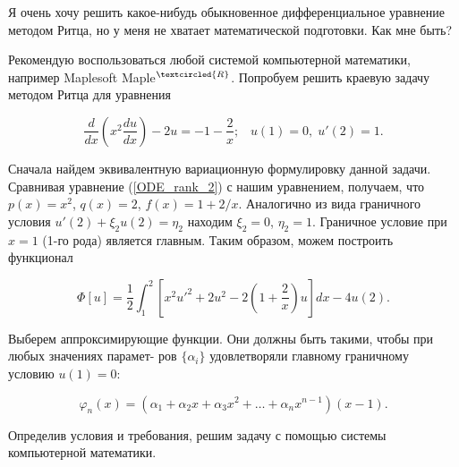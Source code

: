 \documentclass{article}
\begin{document}
\newpage
\begin{question}
	Я очень хочу решить какое-нибудь обыкновенное дифференциальное уравнение методом Ритца, но у меня не хватает математической подготовки. Как мне быть?
\end{question}

Рекомендую воспользоваться любой системой компьютерной математики, например Maplesoft Maple$^{\textcircled{ \scriptsize R \normalsize} }$. Попробуем решить краевую задачу методом Ритца для уравнения

\begin{displaymath}
	\frac{d}{dx} \left( x^{2} \frac{du}{dx} \right) - 2u = -1 - \frac{2}{x}; \; \; \; u(1) = 0, \; u'(2) = 1.
\end{displaymath}

Сначала найдем эквивалентную вариационную формулировку данной задачи. Сравнивая уравнение (\ref{ODE_rank_2}) с нашим уравнением, получаем, что $p(x) = x^{2}$, $q(x) = 2$, $f(x) = 1 + 2/x$. Аналогично из вида граничного условия $u'(2) + \xi_{2} u(2) = \eta_{2}$ находим $\xi_{2} = 0$, $\eta_{2} = 1$. Граничное условие при $x = 1$ (1-го рода) является главным. Таким образом, можем построить функционал

\begin{displaymath}
	\Phi[u] = \frac{1}{2} \int_{1}^{2} \left[ x^{2} u'^{2} + 2 u^{2} - 2 \left( 1 + \frac{2}{x} \right) u \right] dx - 4 u(2).
\end{displaymath}

Выберем аппроксимирующие функции. Они должны быть такими, чтобы при любых значениях парамет-
ров $\{\alpha_{i}\}$ удовлетворяли главному граничному условию $u(1) = 0$:

\begin{displaymath}
	\varphi_{n}(x) = (\alpha_{1} + \alpha_{2}x + \alpha_{3}x^{2} + \dots + \alpha_{n}x^{n-1}) (x-1).
\end{displaymath}

Определив условия и требования, решим задачу с помощью системы компьютерной математики.
\end{document}
